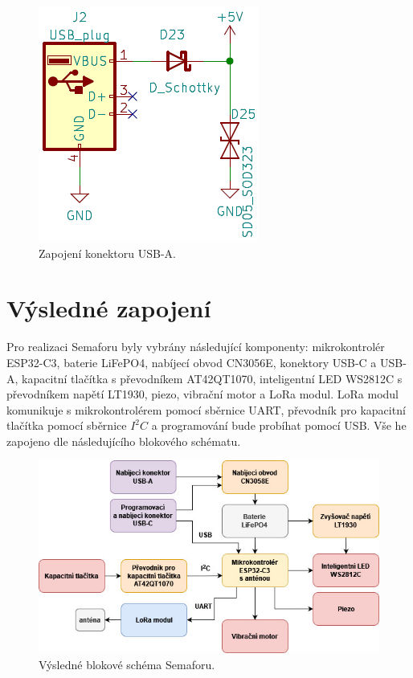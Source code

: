 \begin{figure}[!h]
  \begin{center}
    \includegraphics[scale=0.8]{obrazky/USB_A.png}
  \end{center}
  \caption[Zapojení konektoru USB-A]{Zapojení konektoru USB-A.}
\end{figure}




\section{Výsledné zapojení}
Pro realizaci Semaforu byly vybrány následující komponenty: mikrokontrolér ESP32-C3, baterie LiFePO4, nabíjecí obvod CN3056E, konektory USB-C a USB-A,
kapacitní tlačítka s převodníkem AT42QT1070, inteligentní LED WS2812C s převodníkem napětí LT1930, piezo, vibrační motor a LoRa modul. LoRa modul komunikuje 
s mikrokontrolérem pomocí sběrnice UART, převodník pro kapacitní tlačítka pomocí sběrnice $I^2C$ a programování bude probíhat pomocí USB. Vše he zapojeno 
dle následujícího blokového schématu. 

\begin{figure}[!h]
  \begin{center}
    \includegraphics[scale=0.7]{obrazky/vysledne_blokove_schema.jpg}
  \end{center}
  \caption[Výsledné blokové schéma Semaforu]{Výsledné blokové schéma Semaforu.}
\end{figure}




